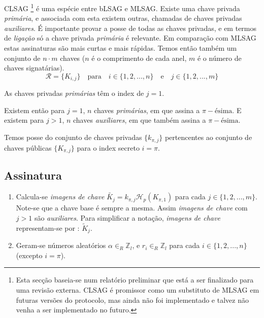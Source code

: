 \begin{description}
CLSAG \cite{MRL-0011-CLSAG}
\footnote{Esta secção baseia-se num relatório preliminar que está a ser finalizado para uma revisão externa. CLSAG é promissor como um substituto de MLSAG em futuras versões do protocolo, mas ainda não foi implementado e talvez não venha a ser implementado no futuro.}
é uma espécie entre bLSAG e MLSAG. Existe uma chave privada {\em primária}, e associada com esta existem outras, chamadas de chaves privadas {\em auxiliares}. É importante provar a posse de todas as chaves privadas, e em termos de {\em ligação} só a chave privada {\em primária} é relevante. Em comparação com MLSAG estas assinaturas são mais curtas e mais rápidas.
Temos então também um conjunto de \(n \cdot m\) chaves ($n$ é o comprimento de cada anel, $m$ é o número de chaves signatárias). 
\vspace{.175cm}
\[\mathcal{R} = \{K_{i,j}\}  \quad \textrm{para} \quad  i \in \{1, 2, ..., n\} \quad \textrm{e} \quad j \in \{1, 2, ..., m\}\]

As chaves privadas {\em primárias} têm o index de \(j = 1\). 

Existem então para \(j = 1\), $n$ chaves {\em primárias}, em que assina a $\pi-\textrm{ésima}$.
E existem para \(j > 1\), $n$ chaves {\em auxíliares}, em que também assina a $\pi-\textrm{ésima}$.  

Temos posse do conjunto de chaves privadas \(\{k_{\pi, j}\}\) pertencentes ao conjunto de chaves públicas \(\{K_{\pi, j}\}\) para o index secreto \(i = \pi\).

\subsection*{Assinatura}

\begin{enumerate}
	\item Calcula-se {\em imagens de chave} \(\tilde{K_j} = k_{\pi, j} \mathcal{H}_p(K_{\pi, 1})\) para cada \(j \in \{1, 2, ..., m\}\). Note-se que a chave base é sempre a mesma. Assim {\em imagens de chave} com $j>1$ são {\em auxiliares}. Para simplificar a notação, 
{\em imagens de chave} representam-se por : $\tilde{K}_j$.

	\item Geram-se números aleatórios \(\alpha \in_R \mathbb{Z}_l\), e \(r_{i} \in_R \mathbb{Z}_l\) para cada \(i \in \{1, 2, ..., n\}\) (excepto \(i = \pi\)).


\end{enumerate}
\end{description}
